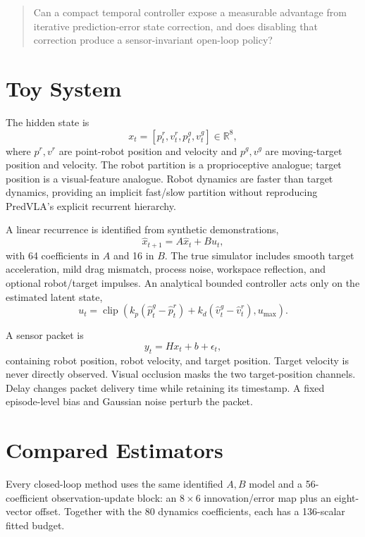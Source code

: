 \documentclass[11pt]{article}
\begin{document}
\begin{quote}
Can a compact temporal controller expose a measurable advantage from iterative prediction-error state correction, and does disabling that correction produce a sensor-invariant open-loop policy?
\end{quote}

\section{Toy System}

The hidden state is
\[
x_t = [p^r_t,v^r_t,p^g_t,v^g_t]\in\mathbb{R}^8,
\]
where $p^r,v^r$ are point-robot position and velocity and $p^g,v^g$ are moving-target position and velocity. The robot partition is a proprioceptive analogue; target position is a visual-feature analogue. Robot dynamics are faster than target dynamics, providing an implicit fast/slow partition without reproducing PredVLA's explicit recurrent hierarchy.

A linear recurrence is identified from synthetic demonstrations,
\[
\hat x_{t+1}=A\hat x_t+B u_t,
\]
with 64 coefficients in $A$ and 16 in $B$. The true simulator includes smooth target acceleration, mild drag mismatch, process noise, workspace reflection, and optional robot/target impulses. An analytical bounded controller acts only on the estimated latent state,
\[
u_t=\operatorname{clip}\left(k_p(\hat p^g_t-\hat p^r_t)+k_d(\hat v^g_t-\hat v^r_t),u_{\max}\right).
\]

A sensor packet is
\[
y_t=H x_t+b+\epsilon_t,
\]
containing robot position, robot velocity, and target position. Target velocity is never directly observed. Visual occlusion masks the two target-position channels. Delay changes packet delivery time while retaining its timestamp. A fixed episode-level bias and Gaussian noise perturb the packet.

\section{Compared Estimators}

Every closed-loop method uses the same identified $A,B$ model and a 56-coefficient observation-update block: an $8\times6$ innovation/error map plus an eight-vector offset. Together with the 80 dynamics coefficients, each has a 136-scalar fitted budget.
\end{document}
